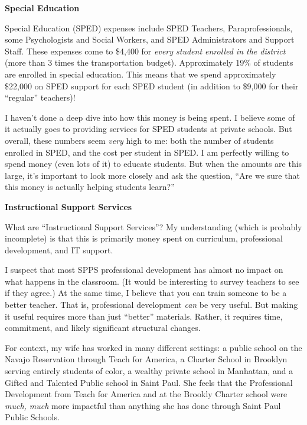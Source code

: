 \documentclass[
]{article}
\begin{document}
\textbf{Special Education}

Special Education (SPED) expenses include SPED Teachers,
Paraprofessionals, some Psychologists and Social Workers, and SPED
Administrators and Support Staff. These expenses come to \$4,400 for
\emph{every student enrolled in the district} (more than 3 times the
transportation budget). Approximately 19\% of students are enrolled in
special education. This means that we spend approximately \$22,000 on
SPED support for each SPED student (in addition to \$9,000 for their
``regular'' teachers)!

I haven't done a deep dive into how this money is being spent. I believe
some of it actually goes to providing services for SPED students at
private schools. But overall, these numbers seem \emph{very} high to me:
both the number of students enrolled in SPED, and the cost per student
in SPED. I am perfectly willing to spend money (even lots of it) to
educate students. But when the amounts are this large, it's important to
look more closely and ask the question, ``Are we sure that this money is
actually helping students learn?''

\textbf{Instructional Support Services}

What are ``Instructional Support Services''? My understanding (which is
probably incomplete) is that this is primarily money spent on
curriculum, professional development, and IT support.

I suspect that most SPPS professional development has almost no impact
on what happens in the classroom. (It would be interesting to survey
teachers to see if they agree.) At the same time, I believe that you can
train someone to be a better teacher. That is, professional development
\emph{can} be very useful. But making it useful requires more than just
``better'' materials. Rather, it requires time, commitment, and likely
significant structural changes.

For context, my wife has worked in many different settings: a public
school on the Navajo Reservation through Teach for America, a Charter
School in Brooklyn serving entirely students of color, a wealthy private
school in Manhattan, and a Gifted and Talented Public school in Saint
Paul. She feels that the Professional Development from Teach for America
and at the Brookly Charter school were \emph{much, much} more impactful
than anything she has done through Saint Paul Public Schools.
\end{document}
